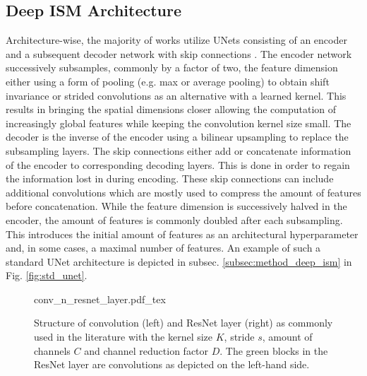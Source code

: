 \subsection{Deep ISM Architecture}
\label{subsec:architecture}
Architecture-wise, the majority of works utilize UNets \cite{ronneberger2015u} consisting of an encoder and a subsequent decoder network with skip connections \cite{prophet2019semantic,sless2019road,wirges2018evidential,weston2019probably,schulter2018learning,lu2019monocular,mani2020monolayout}. The encoder network successively subsamples, commonly by a factor of two, the feature dimension either using a form of pooling (e.g. max or average pooling) to obtain shift invariance or strided convolutions as an alternative with a learned kernel. This results in bringing the spatial dimensions closer allowing the computation of increasingly global features while keeping the convolution kernel size small. The decoder is the inverse of the encoder using a bilinear upsampling \cite{odena2016deconvolution} to replace the subsampling layers. The skip connections either add or concatenate information of the encoder to corresponding decoding layers. This is done in order to regain the information lost in during encoding. These skip connections can include additional convolutions which are mostly used to compress the amount of features before concatenation. While the feature dimension is successively halved in the encoder, the amount of features is commonly doubled after each subsampling. This introduces the initial amount of features as an architectural hyperparameter and, in some cases, a maximal number of features. An example of such a standard UNet architecture is depicted in subsec. \ref{subsec:method_deep_ism} in Fig. \ref{fig:std_unet}.
\\
\begin{figure}
	\begin{center}
		{conv_n_resnet_layer.pdf_tex}
		\caption{\label{fig:conv_n_resnet_layer}Structure of convolution (left) and ResNet layer (right) as commonly used in the literature with the kernel size $K$, stride $s$, amount of channels $C$ and channel reduction factor $D$. The green blocks in the ResNet layer are convolutions as depicted on the left-hand side.}
	\end{center}
\end{figure} 
